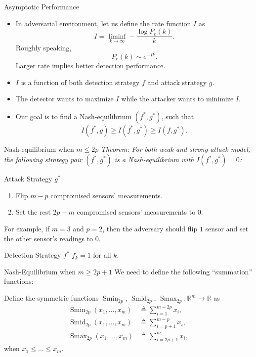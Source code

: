 \documentclass[10pt]{beamer}
\DeclareMathOperator{\Smin}{Smin}
\DeclareMathOperator{\Smid}{Smid}
\DeclareMathOperator{\Smax}{Smax}
\begin{document}
 \begin{frame}{Asymptotic Performance}
   \begin{itemize}
   \item In adversarial environment, let us define the rate function $I$ as
     \begin{displaymath}
       I = \liminf_{k\rightarrow\infty} -\frac{\log P_e(k)}{k}.
     \end{displaymath}
     Roughly speaking, 
     \begin{displaymath}
       P_e(k)\sim e^{-Ik}. 
     \end{displaymath}
     Larger rate implies better detection performance.
   \item  $I$ is a function of both detection strategy $f$ and attack strategy $g$.
   \item The detector wants to maximize $I$ while the attacker wants to minimize $I$.
   \item Our goal is to find a Nash-equilibrium $(f^*,g^*)$, such that
     \begin{displaymath}
       I(f^*,g)\geq I(f^*,g^*) \geq I(f,g^*).	
     \end{displaymath}
   \end{itemize}
 \end{frame}
 
 \begin{frame}{Nash-equilibrium when $m \leq 2p$}
   \it Theorem: For both weak and strong attack model, the following strategy pair $(f^*,g^*)$ is a Nash-equilibrium with $I(f^*,g^*) = 0$:
   \begin{block}{Attack Strategy $g^*$}
     \begin{enumerate}
     \item Flip $m-p$ compromised sensors' measurements.
     \item Set the rest $2p-m$ compromised sensors' measurements to $0$. 
     \end{enumerate}
     For example, if $m=3$ and $p=2$, then the adversary should flip $1$ sensor and set the other sensor's readings to $0$.
   \end{block}
   \begin{block}{Detection Strategy $f^*$}
     $f_k = 1$ for all $k$.
   \end{block}
 \end{frame}
 \begin{frame}{Nash-Equilibrium when $m \geq 2p+1$}
   We need to define the following ``summation'' functions:
   \begin{definition}
     Define the symmetric functions $\Smin_{2p},\,\Smid_{2p},\,\Smax_{2p}:\mathbb R^{m}\rightarrow \mathbb R$ as  
     \begin{align*}
       \Smin_{2p}(x_1,\ldots,x_m) &\triangleq \sum_{i=1}^{m-2p}x_i,\\
       \Smid_{2p}(x_1,\ldots,x_m) &\triangleq \sum_{i=p+1}^{m-p}x_i,\\
       \Smax_{2p}(x_1,\ldots,x_m) &\triangleq \sum_{i=2p+1}^{m}x_i,
     \end{align*}
     when $x_1\leq \dots\leq x_m$.
   \end{definition}
 \end{frame}
 
\end{document}
